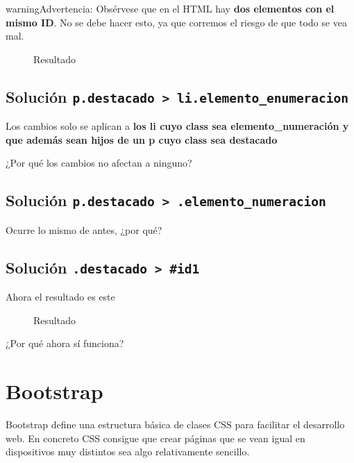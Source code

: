 \documentclass[letterpaper,10pt,spanish]{sphinxmanual}
\begin{document}
\begin{notice}{warning}{Advertencia:}
Obsérvese que en el HTML hay \textbf{dos elementos con el mismo ID}. No se debe hacer esto, ya que corremos el riesgo de que todo se vea mal.
\end{notice}
\begin{figure}[htbp]
\centering
\capstart

\noindent{}
\caption{Resultado}\label{tema3:id11}\end{figure}


\subsection{Solución \texttt{p.destacado \textgreater{} li.elemento\_enumeracion}}
\label{tema3:solucion-p-destacado-li-elemento-enumeracion}
Los cambios solo se aplican a \textbf{los li cuyo class sea elemento\_numeración y que además sean hijos de un p cuyo class sea destacado}

¿Por qué los cambios no afectan a ninguno?


\subsection{Solución \texttt{p.destacado \textgreater{} .elemento\_numeracion}}
\label{tema3:solucion-p-destacado-elemento-numeracion}
Ocurre lo mismo de antes, ¿por qué?


\subsection{Solución \texttt{.destacado \textgreater{} \#id1}}
\label{tema3:solucion-destacado-id1}
Ahora el resultado es este
\begin{figure}[htbp]
\centering
\capstart

\noindent{}
\caption{Resultado}\label{tema3:id12}\end{figure}

¿Por qué ahora sí funciona?


\section{Bootstrap}
\label{tema3:bootstrap}
Bootstrap define una estructura básica de clases CSS para facilitar el desarrollo web. En concreto CSS consigue que crear páginas que se vean igual en dispositivos muy distintos sea algo relativamente sencillo.
\end{document}
